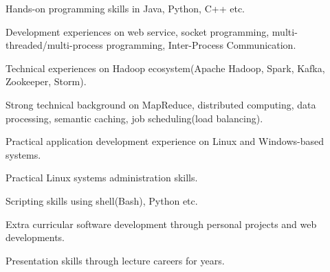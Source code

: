 


\begin{cventries}

\begin{cvitems}
\item {Hands-on programming skills in Java, Python, C++ etc.}
\item {Development experiences on web service, socket programming, multi-threaded/multi-process programming, Inter-Process Communication.}
\item {Technical experiences on Hadoop ecosystem(Apache Hadoop, Spark, Kafka, Zookeeper, Storm).}
\item {Strong technical background on MapReduce, distributed computing, data processing, semantic caching, job scheduling(load balancing).}
\item {Practical application development experience on Linux and Windows-based systems.}
\item {Practical Linux systems administration skills.}
\item {Scripting skills using shell(Bash), Python etc.}
\item {Extra curricular software development through personal projects and web developments.}
\item {Presentation skills through lecture careers for years.}
\newline
\end{cvitems}

\end{cventries}
